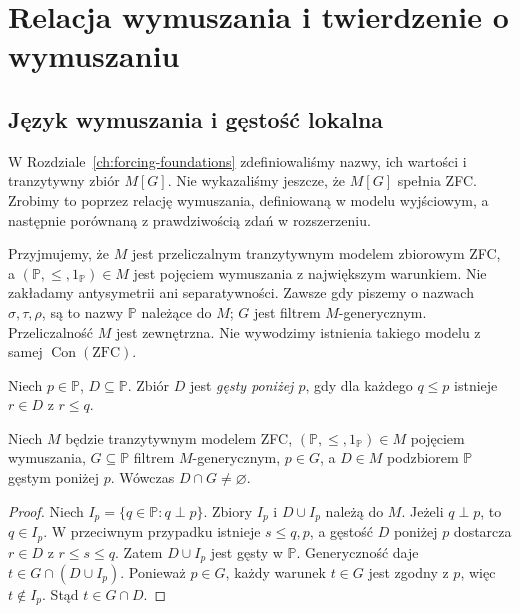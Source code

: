 \chapter{Relacja wymuszania i twierdzenie o wymuszaniu}
\label{ch:forcing-theorem}

\section{Język wymuszania i gęstość lokalna}
W Rozdziale~\ref{ch:forcing-foundations} zdefiniowaliśmy
nazwy, ich wartości i tranzytywny zbiór $M[G]$.
Nie wykazaliśmy jeszcze, że $M[G]$ spełnia ZFC.
Zrobimy to poprzez relację wymuszania, definiowaną
w modelu wyjściowym, a następnie porównaną
z prawdziwością zdań w rozszerzeniu.

\begin{uwaga}[Założenia]
\label{rem:forcing33-background}
Przyjmujemy, że $M$ jest przeliczalnym
tranzytywnym modelem zbiorowym ZFC,
a $(\mathbb P,\leq,1_{\mathbb P})\in M$
jest pojęciem wymuszania z największym warunkiem.
Nie zakładamy antysymetrii ani separatywności.
Zawsze gdy piszemy o nazwach $\sigma,\tau,\rho$,
są to nazwy $\mathbb P$ należące do $M$;
$G$ jest filtrem $M$-generycznym.
Przeliczalność $M$ jest zewnętrzna.
Nie wywodzimy istnienia takiego modelu
z samej $\operatorname{Con}(\mathrm{ZFC})$.
\end{uwaga}

\begin{definicja}
\label{def:forcing33-local-dense}
Niech $p\in\mathbb P$, $D\subseteq\mathbb P$.
Zbiór $D$ jest \emph{gęsty poniżej $p$},
gdy dla każdego $q\leq p$ istnieje
$r\in D$ z $r\leq q$.
\end{definicja}

\begin{lemat}
\label{lem:forcing33-local-generic}
Niech $M$ będzie tranzytywnym modelem ZFC,
$(\mathbb P,\leq,1_{\mathbb P})\in M$
pojęciem wymuszania, $G\subseteq\mathbb P$
filtrem $M$-generycznym,
$p\in G$, a $D\in M$ podzbiorem
$\mathbb P$ gęstym poniżej $p$.
Wówczas $D\cap G\neq\varnothing$.
\end{lemat}
\begin{proof}
Niech $I_p=\{q\in\mathbb P:q\perp p\}$.
Zbiory $I_p$ i $D\cup I_p$ należą do $M$.
Jeżeli $q\perp p$, to $q\in I_p$.
W przeciwnym przypadku istnieje
$s\leq q,p$, a gęstość $D$ poniżej $p$
dostarcza $r\in D$ z $r\leq s\leq q$.
Zatem $D\cup I_p$ jest gęsty w $\mathbb P$.
Generyczność daje $t\in G\cap(D\cup I_p)$.
Ponieważ $p\in G$, każdy warunek $t\in G$
jest zgodny z $p$, więc $t\notin I_p$.
Stąd $t\in G\cap D$.
\end{proof}


